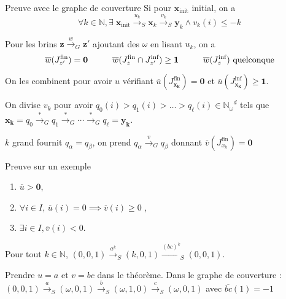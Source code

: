 \documentclass[french]{beamer}
\let\inter\cap
\newcommand{\N}{\ensuremath{\mathbb{N}}}
\newcommand{\Nomega}{\ensuremath{\mathbb{N}_\omega}}
\newcommand{\trans}[2]{\ensuremath{\stackrel{#1}{\longrightarrow}_{#2}}}
\newcommand{\vect}[1]{\ensuremath{\mathbf{#1}}}
\newcommand{\xinit}{\ensuremath{\vect{x}_\text{init}}}
\newcommand{\valeur}[1]{\ensuremath{\overline{#1}}}
\newcommand{\Jfin}[1]{J^\text{fin}_{#1}}
\newcommand{\Jinf}[1]{J^\text{inf}_{#1}}
\begin{document}
\begin{frame}{Preuve avec le graphe de couverture}
    Si pour $\xinit$ initial, on a
    $$\forall k\in\N, \exists \; \xinit \trans{u_k}{S} \vect{x}_k \trans{v_k}{S} \vect{y}_k \land v_k(i) \leq -k$$
    
    Pour les brins $\vect{z} \trans{w}{G} \vect{z'}$ ajoutant des $\omega$ en lisant $u_k$, on a
$$\valeur{w}(\Jfin{z'})=\vect{0} \hspace{10mm}
\valeur{w}(\Jfin{z}\inter \Jinf{z'})\geq \vect{1} \hspace{10mm}
\valeur{w}(\Jinf{z}) \text{ quelconque}$$

On les combinent pour avoir $u$ vérifiant $\valeur{u}(\Jfin{\vect{x_k}}) =\vect{0}$ et $\valeur{u}(\Jinf{\vect{x_k}}) \geq\vect{1}$.

\vspace{8mm}
On divise $v_k$ pour avoir $q_0(i) > q_1(i) > \dots > q_\ell(i) \in\Nomega^d$ tels que $\vect{x_k} = q_0 \trans{*}{G} q_1 \trans{*}{G} \cdots \trans{*}{G} q_\ell = \vect{y_k}$.

\vspace{3mm}
$k$ grand fournit $q_\alpha = q_\beta$, on prend $q_\alpha \trans{v}{G} q_\beta$ donnant $\valeur{v}(\Jfin{x_k}) =\vect{0}$

\end{frame}

\begin{frame}{Preuve sur un exemple}
\begin{theorem}[rappel]
\begin{enumerate}
    \item $\valeur{u} > \vect{0}$,
    \item $\forall i \in I$, $\valeur{u}(i)=0 \implies \valeur{v}(i) \geq 0$ ,
    \item $\exists i\in I, \valeur{v}(i) < 0$.
\end{enumerate}
\end{theorem}

\begin{example}
Pour tout $k\in\N$, $(0,0,1) \trans{a^k}{S} (k,0,1) \trans{(bc)^k}{S} (0,0,1)$.

\vspace{2mm}
Prendre $u=a$ et $v=bc$ dans le théorème.
Dans le graphe de couverture :
$(0,0,1) \trans{a}{S} (\omega,0,1) \trans{b}{S} (\omega,1,0) \trans{c}{S} (\omega,0,1)$
avec $\valeur{bc}(1)= -1$
\end{example}

\end{frame}
\end{document}
